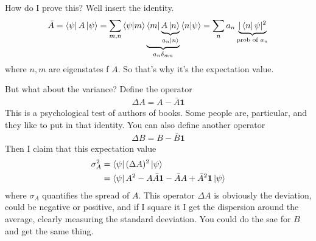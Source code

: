 How do I prove this?
Well insert the identity.
\begin{align}
    \bar{A} = \bra{\psi} A\ket{\psi}
    = \sum_{m,n} \braket{\psi}{m}\underbrace{\bra{m} 
    \underbrace{A \ket{n}}_{a_n\ket{n}}}_{a_n\delta_{mn}} \braket{n}{\psi}
    = \sum_{n} a_n \underbrace{|\bra{n}{\psi}|^2}_{\text{prob of }a_n}
\end{align}
where $n,m$ are eigenstates f $A$.
So that's why it's the expectation value.

But what about the variance?
Define the operator
\begin{align}
    \Delta A = A - \bar{A}\mathbf{1}
\end{align}
This is a psychological test of authors of books.
Some people are, particular,
and they like to put in that identity.
You can also define another operator
\begin{align}
    \Delta B = B - \bar{B}\mathbf{1}
\end{align}
Then I claim that this expectation value
\begin{align}
    \sigma_A^2 &= \bra{\psi} (\Delta A)^2 \ket{\psi}\\
    &= \bra{\psi}
    A^2 - A\bar{A} \mathbf{1} - \bar{A} A + \bar{A}^2 \mathbf{1}
    \ket{\psi}
\end{align}
where $\sigma_A$ quantifies the spread of $A$.
This operator $\Delta A$ is obviously the deviation,
could be negative or positive,
and if I square it I get the dispersion around the average,
clearly measuring the standard deeviation.
You could do the sae for $B$ and get the same thing.

